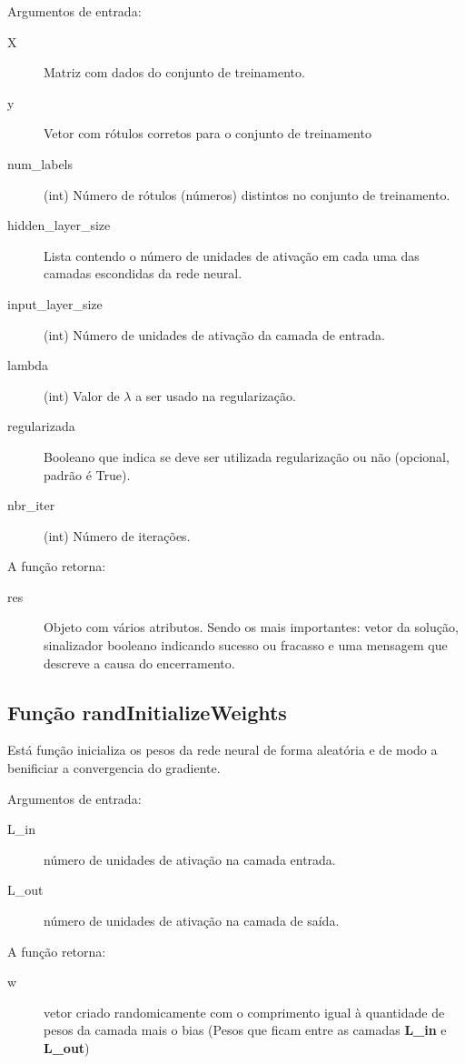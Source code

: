 \documentclass[12pt]{article}
\begin{document}
Argumentos de entrada:
\begin{description} 

\item[X] Matriz com dados do conjunto de treinamento.
\item[y] Vetor com rótulos corretos para o conjunto de treinamento
\item[num\_labels] (int) Número de rótulos (números) distintos no conjunto de treinamento.
\item[hidden\_layer\_size] Lista contendo o número de unidades de ativação em cada uma das camadas escondidas da rede neural.
\item[input\_layer\_size] (int) Número de unidades de ativação da camada de entrada.
\item[lambda] (int) Valor de $\lambda$ a ser usado na regularização.
\item[regularizada] Booleano que indica se deve ser utilizada regularização ou não (opcional, padrão é True).
\item[nbr\_iter] (int) Número de iterações.
\end{description}

A função retorna: 
\begin{description}
\item[res] Objeto com vários atributos. Sendo os mais importantes: vetor da solução, sinalizador booleano indicando sucesso ou fracasso e uma mensagem que descreve a causa do encerramento.
\end{description}

\subsection{Função randInitializeWeights}

Está função inicializa os pesos da rede neural de forma aleatória e de modo a benificiar a convergencia do gradiente. 

Argumentos de entrada:
\begin{description}
\item[L\_in] número de unidades de ativação na camada entrada.
\item[L\_out] número de unidades de ativação na camada de saída.
\end{description}
A função retorna:
\begin{description}
\item[w] vetor criado randomicamente com o comprimento igual à quantidade de pesos da camada mais o bias (Pesos que ficam entre as camadas \textbf{L\_in} e \textbf{L\_out})
\end{description}
\end{document}
